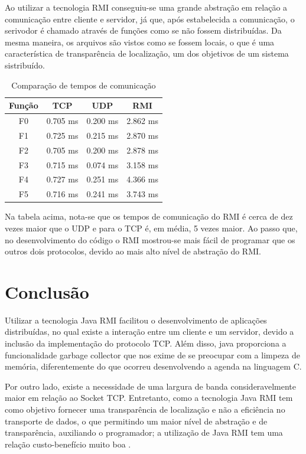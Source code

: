 \documentclass[10pt,a4paper]{article}
\begin{document}
Ao utilizar a tecnologia RMI conseguiu-se uma grande abstração em relação a
comunicação entre cliente e servidor, já que, após estabelecida a comunicação, o serivodor
é chamado através de funções como se não fossem distribuídas. Da mesma maneira, os arquivos são vistos como se fossem locais,
o que é uma característica de transparência de localização, um dos objetivos de um sistema sistribuído. 

\begin{table}[h!]
  \begin{center}
  
    \begin{tabular}{cccc}
      
      Função& TCP&  UDP & RMI\\
      \hline
      F0 & 0.705 ms & 0.200 ms & 2.862 ms\\
      F1 & 0.725 ms & 0.215 ms & 2.870 ms\\
      F2 & 0.705 ms & 0.200 ms & 2.878 ms\\
      F3 & 0.715 ms & 0.074 ms & 3.158 ms\\
      F4 & 0.727 ms & 0.251 ms & 4.366 ms\\
      F5 & 0.716 ms & 0.241 ms & 3.743 ms
    \end{tabular}
  \end{center}
      \vspace{-5mm}
    \caption{Comparação de tempos de comunicação} \label{}
\end{table}

Na tabela acima, nota-se que os tempos de comunicação do RMI é cerca de dez vezes maior que o UDP e para o TCP é, em média, 5 vezes maior. Ao passo que, no desenvolvimento do código o RMI mostrou-se mais fácil de programar que os outros dois protocolos, devido ao mais alto nível de abstração do RMI.

\section{Conclusão}

Utilizar a tecnologia Java RMI facilitou o desenvolvimento de aplicações distribuídas,
no qual existe a interação entre um cliente e um servidor, devido a inclusão da implementação 
do protocolo TCP. Além disso, java proporciona a funcionalidade garbage collector que nos exime de
se preocupar com a limpeza de memória, diferentemente do que ocorreu desenvolvendo a agenda na linguagem C.

Por outro lado, existe a necessidade de uma largura de banda consideravelmente
maior em relação ao Socket TCP. Entretanto, como a tecnologia Java RMI
tem como objetivo fornecer uma transparência de localização e não a eficiência no
transporte de dados, o que permitindo um maior nível de abstração e de transparência,
auxiliando o programador; a utilização de Java RMI tem uma relação custo-benefício muito boa .
\end{document}
